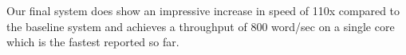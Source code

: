 \documentclass[11pt,a4paper]{article}
\begin{document}
Our final system does show an impressive increase in speed of 110x compared to the baseline system and achieves a throughput of 800 word/sec on a single core which is the fastest reported so far.

\newpage

%

%
%


\end{document}
